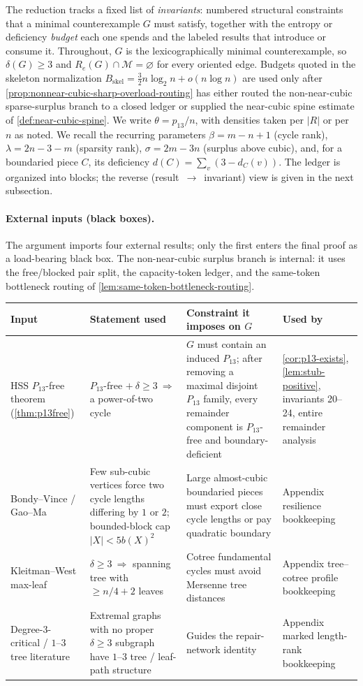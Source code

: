 \documentclass[11pt]{article}
\newcommand{\Mers}{\mathcal M}
\begin{document}
The reduction tracks a fixed list of \emph{invariants}: numbered structural constraints that a minimal counterexample $G$ must satisfy, together with the entropy or deficiency \emph{budget} each one spends and the labeled results that introduce or consume it.  Throughout, $G$ is the lexicographically minimal counterexample, so $\delta(G)\ge3$ and $R_e(G)\cap\Mers=\varnothing$ for every oriented edge.  Budgets quoted in the skeleton normalization $B_{\mathrm{skel}}=\tfrac32 n\log_2 n+o(n\log n)$ are used only after \cref{prop:nonnear-cubic-sharp-overload-routing} has either routed the non-near-cubic sparse-surplus branch to a closed ledger or supplied the near-cubic spine estimate of \cref{def:near-cubic-spine}.  We write $\theta=p_{13}/n$, with densities taken per $|R|$ or per $n$ as noted.  We recall the recurring parameters $\beta=m-n+1$ (cycle rank), $\lambda=2n-3-m$ (sparsity rank), $\sigma=2m-3n$ (surplus above cubic), and, for a boundaried piece $C$, its deficiency $d(C)=\sum_{v}(3-d_C(v))$.  The ledger is organized into blocks; the reverse (result~$\to$~invariant) view is given in the next subsection.

\paragraph{External inputs (black boxes).}
The argument imports four external results; only the first enters the final
proof as a load-bearing black box.  The non-near-cubic surplus branch is
internal: it uses the
free/blocked pair split, the capacity-token ledger, and the same-token
bottleneck routing of \cref{lem:same-token-bottleneck-routing}.

{\small
\begin{longtable}{L{0.17\textwidth} L{0.28\textwidth} L{0.27\textwidth} L{0.20\textwidth}}
\toprule
\textbf{Input} & \textbf{Statement used} & \textbf{Constraint it imposes on $G$} & \textbf{Used by} \\
\midrule
\endhead
HSS $P_{13}$-free theorem (\cref{thm:p13free}) & $P_{13}$-free $+\ \delta\ge3\ \Rightarrow$ a power-of-two cycle & $G$ must contain an induced $P_{13}$; after removing a maximal disjoint $P_{13}$ family, every remainder component is $P_{13}$-free and boundary-deficient & \cref{cor:p13-exists}, \cref{lem:stub-positive}, invariants 20--24, entire remainder analysis \\
Bondy--Vince / Gao--Ma & Few sub-cubic vertices force two cycle lengths differing by $1$ or $2$; bounded-block cap $|X|<5b(X)^2$ & Large almost-cubic boundaried pieces must export close cycle lengths or pay quadratic boundary & Appendix resilience bookkeeping \\
Kleitman--West max-leaf & $\delta\ge3\ \Rightarrow$ spanning tree with $\ge n/4+2$ leaves & Cotree fundamental cycles must avoid Mersenne tree distances & Appendix tree--cotree profile bookkeeping \\
Degree-3-critical / $1$--$3$ tree literature & Extremal graphs with no proper $\delta\ge3$ subgraph have $1$--$3$ tree / leaf-path structure & Guides the repair-network identity & Appendix marked length-rank bookkeeping \\
\bottomrule
\end{longtable}
}
\end{document}
